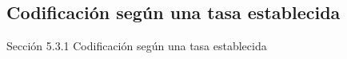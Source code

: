 \documentclass{beamer}
\theoremstyle{plain}
\theoremstyle{example}
\theoremstyle{example}
\begin{document}











\subsection{Codificación según una tasa establecida}


\begin{frame}   \footnotesize
{
\begin{block}{Sección 5.3.1}
Codificación según una tasa establecida
\end{block}
}
\end{frame}
\end{document}
